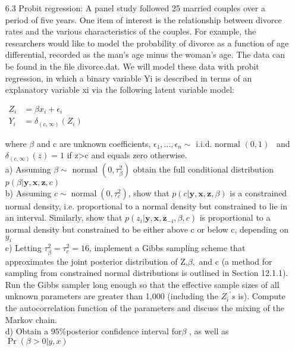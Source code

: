\documentclass[a4paper]{article}
\begin{document}
\begin{enumerate}
 
 \item[6.3] 
Probit regression: A panel study followed 25 married couples over a period of five years. One item of interest is the relationship between divorce rates and the various characteristics of the couples. For example, the researchers would like to model the probability of divorce as a function of age differential, recorded as the man’s age minus the woman’s age. The data can be found in the file divorce.dat. We will model these data with probit regression, in which a binary variable Yi is described in terms of an explanatory variable xi via the following latent variable model:
\begin{center}
    $\begin{aligned} Z_{i} &=\beta x_{i}+\epsilon_{i} \\ Y_{i} &=\delta_{(c, \infty)}\left(Z_{i}\right) \end{aligned}$
\end{center}
 where $ \beta$  and c are unknown coefficients, $ \epsilon_{1}, \ldots, \epsilon_{n} \sim \text { i.i.d. normal }(0,1)$ \ and $ \delta_{(c, \infty)}(z)=1 $ if  z>c  and equals zero otherwise. \\

a) Assuming $ \beta \sim \text { normal }\left(0, \tau_{\beta}^{2}\right) $ obtain the full conditional distribution $  p(\beta | \boldsymbol{y}, \boldsymbol{x}, \boldsymbol{z}, c) $\\
 b) Assuming $ c \sim \operatorname{normal}\left(0, \tau_{c}^{2}\right)$,  show that $ p(c | \boldsymbol{y}, \boldsymbol{x}, \boldsymbol{z}, \beta)$  is a constrained  normal density, i.e. proportional to a normal density but constrained to lie in an interval. Similarly, show that $p\left(z_{i} | \boldsymbol{y}, \boldsymbol{x}, \boldsymbol{z}_{-i}, \beta, c\right)$  is proportional to a normal density but constrained to be either above  c  or  below  c,  depending on $ y_{i}$\\
 c) Letting $ \tau_{\beta}^{2}=\tau_{c}^{2}=16 $, implement a Gibbs sampling scheme that approximates the joint posterior distribution of  Z,$ \beta,$  and  c  (a method for sampling from constrained normal distributions is outlined in Section 12.1.1). Run the Gibbs sampler long enough so that the effective  sample sizes of all unknown parameters are greater than 1,000 (including the $ {Z_i}^{'}s$  is). Compute the autocorrelation function of the parameters  and discuss the mixing of the Markov chain. \\ 
d) Obtain a $95 \%$posterior confidence interval for$\beta $ , as well as $\operatorname{Pr}(\beta> 0 | y, x)$

 
 
\end{enumerate}
 
% 
\end{document}
